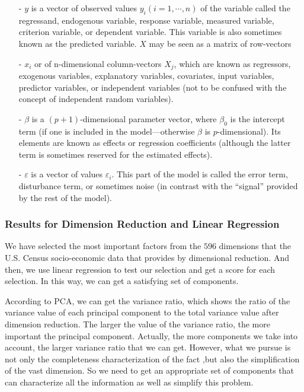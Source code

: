 \documentclass{mcmthesis}
\begin{document}
\begin{itemize}
\item[-] $y$ is a vector of observed values $y_{i} ( i = 1, \cdots, n )$ of the variable called the regressand, endogenous variable, response variable, measured variable, criterion variable, or dependent variable. This variable is also sometimes known as the predicted variable. $X$ may be seen as a matrix of row-vectors 
\item[-] $x_{i}$ or of n-dimensional column-vectors $X_{j}$, which are known as regressors, exogenous variables, explanatory variables, covariates, input variables, predictor variables, or independent variables (not to be confused with the concept of independent random variables).
 \item[-] $\beta$ is a $( p + 1 )$-dimensional parameter vector, where $\beta _{0}$ is the intercept term (if one is included in the model—otherwise $\beta$ is $p$-dimensional). Its elements are known as effects or regression coefficients (although the latter term is sometimes reserved for the estimated effects).
\item[-] $\varepsilon$ is a vector of values $\varepsilon _{i}$. This part of the model is called the error term, disturbance term, or sometimes noise (in contrast with the ``signal'' provided by the rest of the model).

\end{itemize}

\subsubsection{Results for Dimension Reduction and Linear Regression}\label{sec:DRLR}

We have selected the most important factors from the $596$ dimensions that the U.S. Census socio-economic data that provides by dimensional reduction. And then, we use linear regression to test our selection and get a score for each selection. In this way, we can get a satisfying set of components. 

According to PCA, we can get the variance ratio, which shows the ratio of the variance value of each principal component to the total variance value after dimension reduction. The larger the value of the variance ratio, the more important the principal component. Actually, the more components we take into account, the larger variance ratio that we can get. However, what we pursue is not only the completeness characterization of the fact ,but also the simplification of the vast dimension. So we need to get an appropriate set of components that can characterize all the information as well as simplify this problem.
\end{document}
